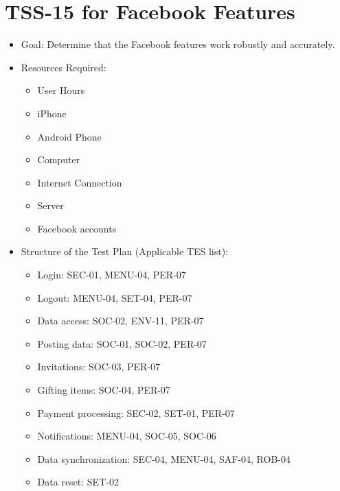 \section{TSS-15 for Facebook Features}
\begin{itemize}
\item Goal: Determine that the Facebook features work robustly and accurately.
\item Resources Required:
\begin{itemize}
\item User Hours 
\item iPhone 
\item Android Phone 
\item Computer 
\item Internet Connection 
\item Server
\item Facebook accounts
\end{itemize} 
\item Structure of the Test Plan (Applicable TES list): 

\begin{itemize}
\item Login: SEC-01, MENU-04, PER-07
\item Logout: MENU-04, SET-04, PER-07
\item Data access: SOC-02, ENV-11, PER-07
\item Posting data: SOC-01, SOC-02, PER-07
\item Invitations: SOC-03, PER-07
\item Gifting items: SOC-04, PER-07
\item Payment processing: SEC-02, SET-01, PER-07
\item Notifications: MENU-04, SOC-05, SOC-06
\item Data synchronization: SEC-04, MENU-04, SAF-04, ROB-04
\item Data reset: SET-02
\end{itemize}
\end{itemize}

